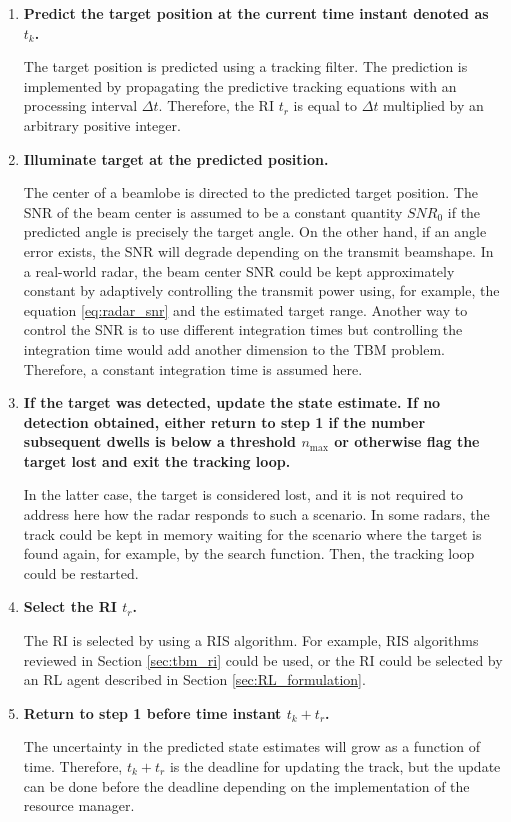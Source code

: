 \documentclass[english, 12pt, a4paper, elec, utf8, a-1b, online]{aaltothesis}
\numberwithin{equation}{section}
\newcommand{\sno}{SNR_0}
\newcommand{\nmax}{n_\text{max}}
\newcommand{\dt}{\Delta t}
\newcommand{\ri}{t_r}
\begin{document}
\begin{enumerate}
\item\textbf{Predict the target position at the current time instant denoted as $t_k$.}

The target position is predicted using a tracking filter. The prediction is implemented by propagating the predictive tracking equations with an processing interval $\dt$. 
Therefore, the RI $t_r$ is equal to $\dt$ multiplied by an arbitrary positive integer.

\item\textbf{Illuminate target at the predicted position.}

The center of a beamlobe is directed to the predicted target position. 
The SNR of the beam center is assumed to be a constant quantity $\sno$ if the predicted angle is precisely the target angle. 
On the other hand, if an angle error exists, the SNR will degrade depending on the transmit beamshape. 
In a real-world radar, the beam center SNR could be kept approximately constant by adaptively controlling the transmit power using, for example, the equation \eqref{eq:radar_snr} and the estimated target range. 
Another way to control the SNR is to use different integration times but controlling the integration time would add another dimension to the TBM problem. 
Therefore, a constant integration time is assumed here.

\item\textbf{If the target was detected, update the state estimate. If no detection obtained, either return to step 1 if the number subsequent dwells is below a threshold $\nmax$ or otherwise flag the target lost and exit the tracking loop.}

In the latter case, the target is considered lost, and it is not required to address here how the radar responds to such a scenario. 
In some radars, the track could be kept in memory waiting for the scenario where the target is found again, for example, by the search function. 
Then, the tracking loop could be restarted.


\item\textbf{Select the RI $\ri$.}

The RI is selected by using a RIS algorithm.
For example, RIS algorithms reviewed in Section \ref{sec:tbm_ri} could be used, or the RI could be selected by an RL agent described in Section \ref{sec:RL_formulation}.

\item\textbf{Return to step 1 before time instant $t_k + \ri$.}

The uncertainty in the predicted state estimates will grow as a function of time. Therefore, $t_k + \ri$ is the deadline for updating the track, but the update can be done before the deadline depending on the implementation of the resource manager.

\end{enumerate}
\end{document}

